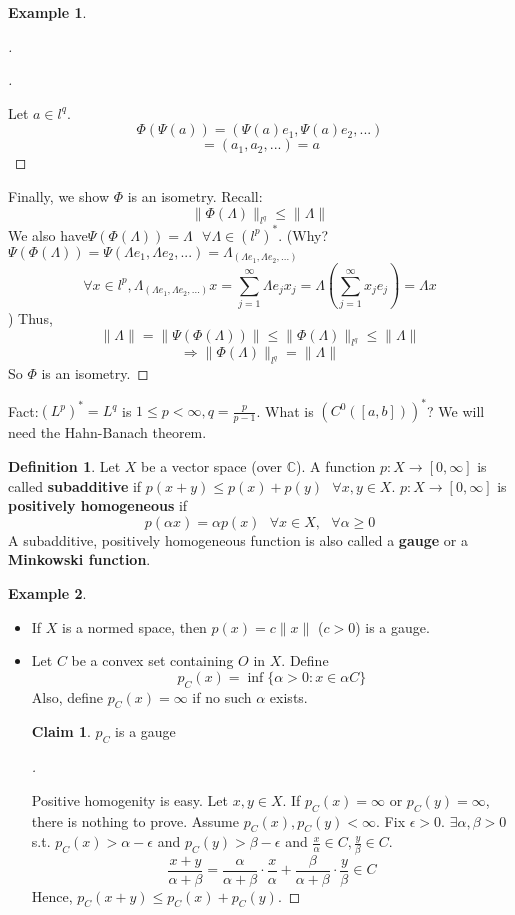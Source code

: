 \documentclass{article}
\newcommand{\sfa}{\text{  } \forall}
\theoremstyle{definition}
\newtheorem{ex}{Example}
\newtheorem{dfn}{Definition}
\newtheorem*{clm}{Claim}
\newenvironment{proofs}[1][\proofname]{%
  \begin{proof}[#1]$ $\par\nobreak\ignorespaces
}{%
  \end{proof}
}
\begin{document}
\begin{ex}
\begin{proofs}
		\begin{proofs}
			Let $a \in l^q$.
			\[
				\Phi(\Psi(a)) = (\Psi(a) e_1, \Psi(a) e_2, ...) 
			\]
			\[
				= (a_1, a_2, ...) = a
			\]
		\end{proofs}
	Finally, we show $\Phi$ is an isometry.
	Recall: 
	\[
		\|\Phi(\Lambda)\|_{l^q} \leq \|\Lambda\|
	\]
	We also have$\Psi(\Phi(\Lambda)) = \Lambda \sfa \Lambda \in (l^p)^*$. (Why? $\Psi(\Phi(\Lambda)) = \Psi(\Lambda e_1, \Lambda e_2, ...) = \Lambda_{(\Lambda e_1, \Lambda e_2, ...)}$
	\[
		\forall x \in l^p, \Lambda_{(\Lambda e_1, \Lambda e_2, ...)} x = \sum_{j = 1}^\infty \Lambda e_j x_j = \Lambda \left(\sum_{j = 1}^\infty x_j e_j\right) = \Lambda x
	\]
	) Thus, 
	\[
		\| \Lambda \| = \|\Psi(\Phi(\Lambda))\| \leq \|\Phi(\Lambda)\|_{l^q} \leq \|\Lambda\|
	\]
	\[
		\Rightarrow \|\Phi(\Lambda)\|_{l^q} = \|\Lambda\|
	\]
	So $\Phi$ is an isometry.
	\end{proofs}
\end{ex}

Fact:$(L^p)^* = L^q$ is $1 \leq p < \infty, q = \frac{p}{p - 1}$.
What is $(C^0([a , b]))^*$?
We will need the Hahn-Banach theorem.
\begin{dfn}
	Let $X$ be a vector space (over $\mathbb{C}$). A function $p: X \to [0, \infty]$ is called \textbf{subadditive} if $p(x+y) \leq p(x) + p(y) \sfa x, y \in X$.
	$p:X \to [0, \infty]$ is \textbf{positively homogeneous} if 
	\[
		p(\alpha x) = \alpha p(x) \sfa x \in X, \sfa \alpha \geq 0
	\]
	A subadditive, positively homogeneous function is also called a \textbf{gauge} or a \textbf{Minkowski function}.
\end{dfn}

\begin{ex}
	\begin{itemize}
		\item If $X$ is a normed space, then $p(x)= c \|x\|$ ($c > 0$) is a gauge.

		\item Let $C$ be a convex set containing $O$ in $X$. Define 
			\[
				p_C(x) = \inf \{\alpha > 0: x \in \alpha C\}
			\]
			Also, define $p_C(x) = \infty$ if no such $\alpha$ exists.
			\begin{clm}
				$p_C$ is a gauge
			\end{clm}

			\begin{proofs}
				Positive homogenity is easy. 
				Let $x, y \in X$. If $p_C(x) = \infty$ or $p_C(y) = \infty$, there is nothing to prove.
				Assume $p_C(x), p_C(y) < \infty$.
				Fix $\epsilon > 0$.
				$\exists \alpha, \beta > 0$ s.t. $p_C(x) > \alpha - \epsilon$ and $p_C(y) > \beta - \epsilon$ and $\frac{x}{\alpha} \in C, \frac{y}{\beta} \in C$.
				\[
					\frac{x + y}{\alpha + \beta} = \frac{\alpha}{\alpha + \beta} \cdot \frac{x}{\alpha} + \frac{\beta}{\alpha + \beta} \cdot \frac{y}{\beta} \in C
				\]
				Hence, $p_C(x+y) \leq p_C(x) + p_C(y)$.
			\end{proofs}
	\end{itemize}
\end{ex}
\end{document}
